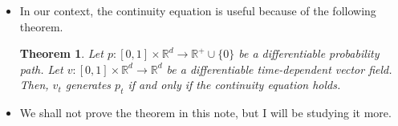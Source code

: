 \documentclass[10pt]{article}
\newtheorem{theorem}[lemma]{Theorem}
\newcommand{\ra}{\rightarrow}
\newcommand{\Real}{\mathbb{R}}
\begin{document}
\begin{itemize}
  \item In our context, the continuity equation is useful because of the following theorem.
  \begin{theorem} \label{thm:continuity-equation}
    Let $p: [0,1] \times \Real^d \rightarrow \Real^+ \cup \{0\}$ be a differentiable probability path. Let $v: [0,1] \times \Real^d \ra \Real^d$ be a differentiable time-dependent vector field. Then, $v_t$ generates $p_t$ if and only if the continuity equation holds.
  \end{theorem}

  \item We shall not prove the theorem in this note, but I will be studying it more.
\end{itemize}


  
\end{document}
